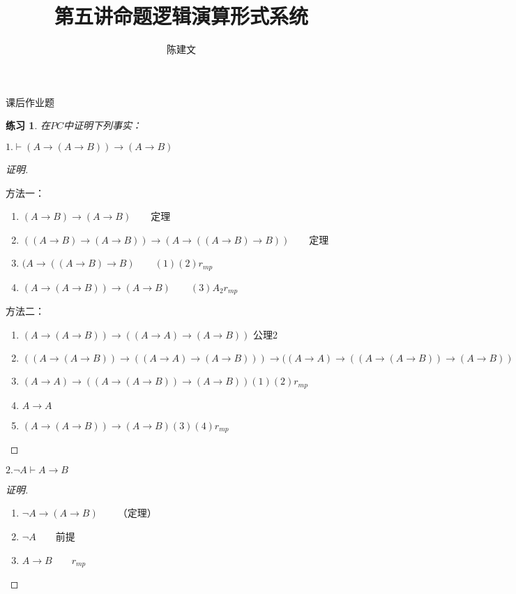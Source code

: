 \documentclass{article}
\newtheorem{Exercise}{练习}
\begin{document}
\begin{CJK*}{UTF8}{gbsn}
  \title{第五讲命题逻辑演算形式系统}
  \author{陈建文}
  \maketitle

  课后作业题

  \begin{Exercise}
    在$PC$中证明下列事实：
  \end{Exercise}

  $1.\vdash (A\to(A\to B))\to (A\to B)$


\begin{proof}[证明]$\quad$

  方法一：

  \begin{enumerate}
    \item $(A\to B)\to (A\to B)\qquad$定理
    \item $((A\to B)\to (A\to B))\to (A\to ((A\to B)\to B))\qquad$定理
    \item $(A\to ((A\to B)\to B)\qquad(1)(2)r_{mp}$
    \item $(A\to(A\to B))\to (A\to B)\qquad(3)A_2r_{mp}$
  \end{enumerate}
  

  方法二：

  \begin{enumerate}
    \item $(A\to(A\to B))\to ((A\to A)\to (A\to B))$ 公理2
    \item  $((A\to(A\to B))\to ((A\to A)\to (A\to B)))\to ((A\to A) \to ((A\to (A\to B))\to (A\to B))$
    \item $(A\to A) \to ((A\to (A\to B))\to (A\to B))(1)(2)r_{mp}$
    \item $A\to A$
    \item $(A\to(A\to B))\to (A\to B) (3)(4)r_{mp}$
  \end{enumerate}
\end{proof}


$2.\lnot A\vdash A\to B$

\begin{proof}[证明]$\quad$
 
  \begin{enumerate}
    \item $\lnot A\to (A\to B)\qquad $（定理）
    \item $\lnot A\qquad$前提
    \item $A\to B\qquad r_{mp}$
  \end{enumerate}




\end{proof}
\end{CJK*}
\end{document}
